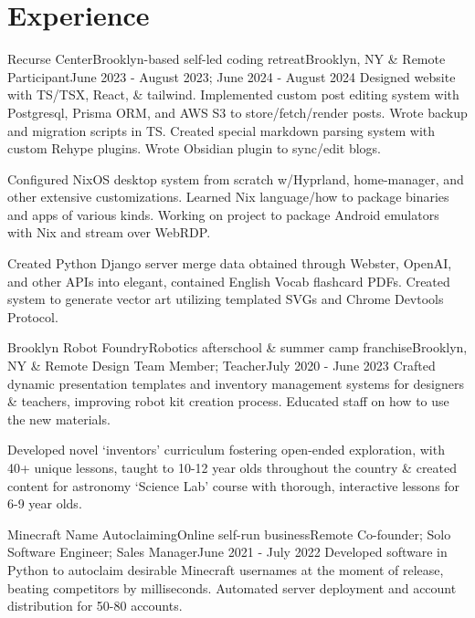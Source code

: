 \documentclass[letterpaper, 10pt]{article}
\begin{document}
	\section{Experience}
	\resumeSubHeadingListStart
	
	\resumeSubheading
	{Recurse Center}{Brooklyn-based self-led coding retreat}{Brooklyn, NY \& Remote}
	{Participant}{June 2023 - August 2023; June 2024 - August 2024}{}
	\resumeItemListStart
		{Designed website with TS/TSX, React, \& tailwind. Implemented custom post editing system with Postgresql, Prisma ORM, and AWS S3 to store/fetch/render posts. Wrote backup and migration scripts in TS. Created special markdown parsing system with custom Rehype plugins. Wrote Obsidian plugin to sync/edit blogs.}
    
    {Configured NixOS desktop system from scratch w/Hyprland, home-manager, and other extensive customizations. Learned Nix language/how to package binaries and apps of various kinds. Working on project to package Android emulators with Nix and stream over WebRDP.}
		
		{Created Python Django server merge data obtained through Webster, OpenAI, and other APIs into elegant, contained English Vocab flashcard PDFs. Created system to generate vector art utilizing templated SVGs and Chrome Devtools Protocol.}
	\resumeItemListEnd
	
	\resumeSubheading
	{Brooklyn Robot Foundry}{Robotics afterschool \& summer camp franchise}{Brooklyn, NY \& Remote}
	{Design Team Member; Teacher}{July 2020 - June 2023}{}
	\resumeItemListStart
    {Crafted dynamic presentation templates and inventory management systems for designers \& teachers, improving robot kit creation process. Educated staff on how to use the new materials.}
		
		{Developed novel `inventors' curriculum fostering open-ended exploration, with 40+ unique lessons, taught to 10-12 year olds throughout the country \& created content for astronomy `Science Lab' course with thorough, interactive lessons for 6-9 year olds.}
		
	\resumeItemListEnd
	
	\resumeSubheading
	{Minecraft Name Autoclaiming}{Online self-run business}{Remote}
	{Co-founder; Solo Software Engineer; Sales Manager}{June 2021 - July 2022}{}
	\resumeItemListStart
		{Developed software in Python to autoclaim desirable Minecraft usernames at the moment of release, beating competitors by milliseconds. Automated server deployment and account distribution for 50-80 accounts.}
		
\end{document}

